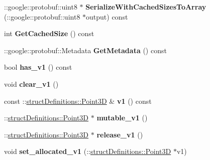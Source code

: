 \begin{DoxyCompactItemize}
\item 
\hypertarget{classstruct_definitions_1_1_block_a94e27f9c4c556aed75891d9f54cc9cfb}{}\label{classstruct_definitions_1_1_block_a94e27f9c4c556aed75891d9f54cc9cfb} 
\+::google\+::protobuf\+::uint8 $\ast$ {\bfseries Serialize\+With\+Cached\+Sizes\+To\+Array} (\+::google\+::protobuf\+::uint8 $\ast$output) const
\item 
\hypertarget{classstruct_definitions_1_1_block_a9f5fb9fac6ce25b259c5eb66437ba5b1}{}\label{classstruct_definitions_1_1_block_a9f5fb9fac6ce25b259c5eb66437ba5b1} 
int {\bfseries Get\+Cached\+Size} () const
\item 
\hypertarget{classstruct_definitions_1_1_block_a122c8267df34a444921be28e9c00b322}{}\label{classstruct_definitions_1_1_block_a122c8267df34a444921be28e9c00b322} 
\+::google\+::protobuf\+::\+Metadata {\bfseries Get\+Metadata} () const
\item 
\hypertarget{classstruct_definitions_1_1_block_aad16edb1b0911c8ce0d4d4efcc696a79}{}\label{classstruct_definitions_1_1_block_aad16edb1b0911c8ce0d4d4efcc696a79} 
bool {\bfseries has\+\_\+v1} () const
\item 
\hypertarget{classstruct_definitions_1_1_block_abde7460a30c9a185b0a0664414e56e18}{}\label{classstruct_definitions_1_1_block_abde7460a30c9a185b0a0664414e56e18} 
void {\bfseries clear\+\_\+v1} ()
\item 
\hypertarget{classstruct_definitions_1_1_block_a6acb14b7ba893d58d01d7093f58b4c92}{}\label{classstruct_definitions_1_1_block_a6acb14b7ba893d58d01d7093f58b4c92} 
const \+::\hyperlink{classstruct_definitions_1_1_point3_d}{struct\+Definitions\+::\+Point3D} \& {\bfseries v1} () const
\item 
\hypertarget{classstruct_definitions_1_1_block_a49773c2b84dea64f2644246cf1a4e58a}{}\label{classstruct_definitions_1_1_block_a49773c2b84dea64f2644246cf1a4e58a} 
\+::\hyperlink{classstruct_definitions_1_1_point3_d}{struct\+Definitions\+::\+Point3D} $\ast$ {\bfseries mutable\+\_\+v1} ()
\item 
\hypertarget{classstruct_definitions_1_1_block_adf1a2cb9ea017935c05420d4eaa23f53}{}\label{classstruct_definitions_1_1_block_adf1a2cb9ea017935c05420d4eaa23f53} 
\+::\hyperlink{classstruct_definitions_1_1_point3_d}{struct\+Definitions\+::\+Point3D} $\ast$ {\bfseries release\+\_\+v1} ()
\item 
\hypertarget{classstruct_definitions_1_1_block_a73e13366a254c244f97fe075ae1af064}{}\label{classstruct_definitions_1_1_block_a73e13366a254c244f97fe075ae1af064} 
void {\bfseries set\+\_\+allocated\+\_\+v1} (\+::\hyperlink{classstruct_definitions_1_1_point3_d}{struct\+Definitions\+::\+Point3D} $\ast$v1)

\end{DoxyCompactItemize}
